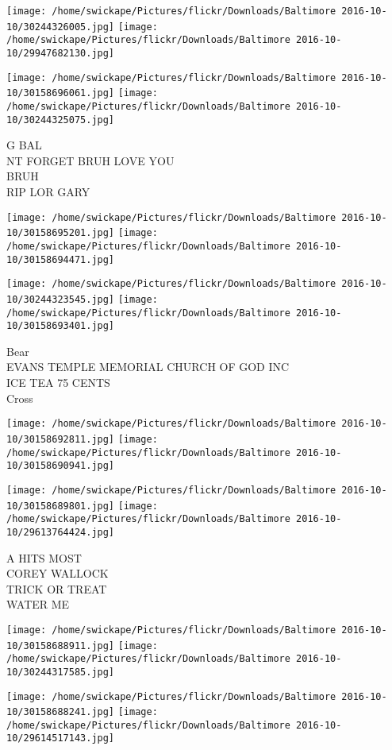 \documentclass[10pt,letterpaper]{article}
\begin{document}
\texttt{[image: /home/swickape/Pictures/flickr/Downloads/Baltimore 2016-10-10/30244326005.jpg]}
\texttt{[image: /home/swickape/Pictures/flickr/Downloads/Baltimore 2016-10-10/29947682130.jpg]}

\texttt{[image: /home/swickape/Pictures/flickr/Downloads/Baltimore 2016-10-10/30158696061.jpg]}
\texttt{[image: /home/swickape/Pictures/flickr/Downloads/Baltimore 2016-10-10/30244325075.jpg]}

G BAL\\
NT FORGET BRUH LOVE YOU\\
BRUH\\
RIP LOR GARY
\pagebreak

\texttt{[image: /home/swickape/Pictures/flickr/Downloads/Baltimore 2016-10-10/30158695201.jpg]}
\texttt{[image: /home/swickape/Pictures/flickr/Downloads/Baltimore 2016-10-10/30158694471.jpg]}

\texttt{[image: /home/swickape/Pictures/flickr/Downloads/Baltimore 2016-10-10/30244323545.jpg]}
\texttt{[image: /home/swickape/Pictures/flickr/Downloads/Baltimore 2016-10-10/30158693401.jpg]}

Bear\\
EVANS TEMPLE MEMORIAL CHURCH OF GOD INC\\
ICE TEA 75 CENTS\\
Cross
\pagebreak

\texttt{[image: /home/swickape/Pictures/flickr/Downloads/Baltimore 2016-10-10/30158692811.jpg]}
\texttt{[image: /home/swickape/Pictures/flickr/Downloads/Baltimore 2016-10-10/30158690941.jpg]}

\texttt{[image: /home/swickape/Pictures/flickr/Downloads/Baltimore 2016-10-10/30158689801.jpg]}
\texttt{[image: /home/swickape/Pictures/flickr/Downloads/Baltimore 2016-10-10/29613764424.jpg]}

A HITS MOST\\
COREY WALLOCK\\
TRICK OR TREAT\\
WATER ME
\pagebreak

\texttt{[image: /home/swickape/Pictures/flickr/Downloads/Baltimore 2016-10-10/30158688911.jpg]}
\texttt{[image: /home/swickape/Pictures/flickr/Downloads/Baltimore 2016-10-10/30244317585.jpg]}

\texttt{[image: /home/swickape/Pictures/flickr/Downloads/Baltimore 2016-10-10/30158688241.jpg]}
\texttt{[image: /home/swickape/Pictures/flickr/Downloads/Baltimore 2016-10-10/29614517143.jpg]}
\end{document}
